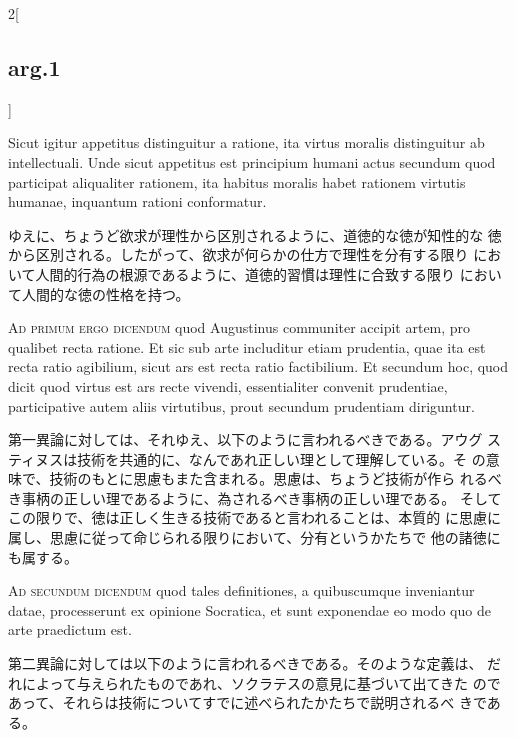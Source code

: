 \documentclass[paper=a4paper,fontsize=10pt,jafontsize=9pt,titlepage]{jlreq}
\begin{document}
\begin{paracol}{2}[\subsection{arg.1}]
\switchcolumn*

Sicut igitur appetitus distinguitur a ratione, ita virtus moralis
 distinguitur ab intellectuali. Unde sicut appetitus est principium
 humani actus secundum quod participat aliqualiter rationem, ita
 habitus moralis habet rationem virtutis humanae, inquantum rationi
 conformatur.

\switchcolumn

ゆえに、ちょうど欲求が理性から区別されるように、道徳的な徳が知性的な
 徳から区別される。したがって、欲求が何らかの仕方で理性を分有する限り
 において人間的行為の根源であるように、道徳的習慣は理性に合致する限り
 において人間的な徳の性格を持つ。

\switchcolumn*[\subsection{ad.1}]

{\scshape Ad primum ergo dicendum} quod Augustinus communiter accipit
artem, pro qualibet recta ratione. Et sic sub arte includitur etiam
prudentia, quae ita est recta ratio agibilium, sicut ars est recta
ratio factibilium. Et secundum hoc, quod dicit quod virtus est ars
recte vivendi, essentialiter convenit prudentiae, participative autem
aliis virtutibus, prout secundum prudentiam diriguntur.

\switchcolumn

第一異論に対しては、それゆえ、以下のように言われるべきである。アウグ
 スティヌスは技術を共通的に、なんであれ正しい理として理解している。そ
 の意味で、技術のもとに思慮もまた含まれる。思慮は、ちょうど技術が作ら
 れるべき事柄の正しい理であるように、為されるべき事柄の正しい理である。
 そしてこの限りで、徳は正しく生きる技術であると言われることは、本質的
 に思慮に属し、思慮に従って命じられる限りにおいて、分有というかたちで
 他の諸徳にも属する。

\switchcolumn*[\subsection{ad.2}]

{\scshape Ad secundum dicendum} quod tales definitiones, a
quibuscumque inveniantur datae, processerunt ex opinione Socratica, et
sunt exponendae eo modo quo de arte praedictum est.

\switchcolumn

第二異論に対しては以下のように言われるべきである。そのような定義は、
 だれによって与えられたものであれ、ソクラテスの意見に基づいて出てきた
 のであって、それらは技術についてすでに述べられたかたちで説明されるべ
 きである。


\end{paracol}
\end{document}
